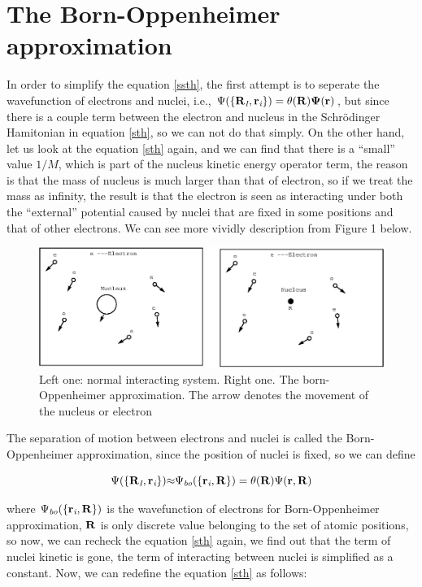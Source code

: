 \documentclass[a4paper]{report}
\begin{document}
\section{The Born-Oppenheimer approximation}
\label{ch:boa}
\noindent In order to simplify the equation  \ref{ssth}, the first attempt is to seperate the wavefunction of electrons and nuclei, i.e., 
$\Psi(\{\bf{R}_\textit{I}, \bf{r}_\textit{i} \}) = {\theta(\bf{R})} {\Psi(\bf{r})} $, but since there is a couple term between the electron and nucleus in the Schrödinger Hamitonian in equation \ref{sth}, 
so we can not do that simply. On the other hand, let us look at the equation
\ref{sth} again, and we can find that there is a “small” value ${1}/{M}$, which is part of the nucleus kinetic energy
operator term, the reason is that the mass of nucleus is much larger than that of electron, so if we treat the mass
as infinity, the result is that the electron is seen as interacting under both the “external” potential caused by nuclei that are fixed in 
some positions and that of other electrons. We can see more vividly description from Figure 1 below.
\begin{figure}[!htb]
\centering
\includegraphics[scale=.5]{system.eps}
\caption{Left one: normal interacting system. Right one. The born-Oppenheimer approximation. The arrow denotes the movement of the nucleus or electron}
\label{fig:bo}
\end{figure}

\noindent The separation of motion between electrons and nuclei is called the Born-Oppenheimer approximation, since the position of nuclei is fixed, so we can define

\begin{equation}\label{nwf}
{\Psi(\{\bf{R}_\textit{I}, \bf{r}_\textit{i} \})}  {\approx}  {\Psi_{ \textit{bo}} ( \{ {\textbf{r}_{\textit{i}}},\bf{R} \}) } = {\theta(\bf{R})} {\Psi(\bf{r}, \bf{R})}
\end{equation}

 \noindent where $\Psi_{ \textit{bo}} ( \{ {\textbf{r}_{\textit{i}}},\bf{R} \})$  is the wavefunction of electrons for Born-Oppenheimer approximation, $\bf R$ is only discrete value belonging to the set of atomic positions, 
 so now, we can recheck the equation \ref{sth} again, we find out that the term of nuclei kinetic is gone, the term of interacting
 between nuclei is simplified as a constant. Now, we can redefine the equation \ref{sth} as follows:
\end{document}
